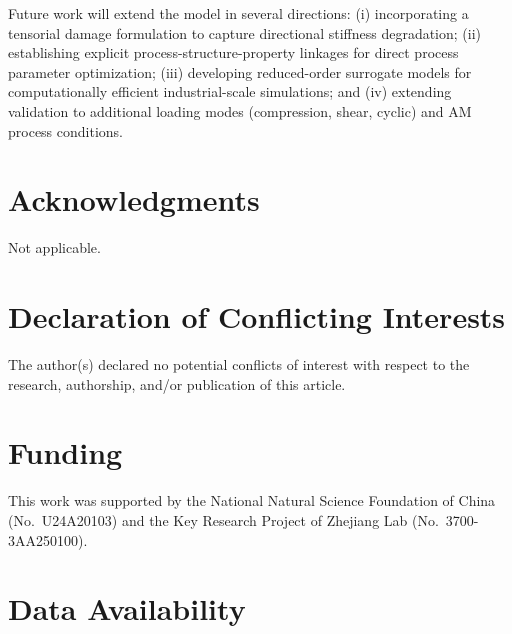 \documentclass[twocolumn]{sagej}
\begin{document}
Future work will extend the model in several directions: (i) incorporating a tensorial damage formulation to capture directional stiffness degradation; (ii) establishing explicit process-structure-property linkages for direct process parameter optimization; (iii) developing reduced-order surrogate models for computationally efficient industrial-scale simulations; and (iv) extending validation to additional loading modes (compression, shear, cyclic) and AM process conditions.

\section*{Acknowledgments}

Not applicable.

\section*{Declaration of Conflicting Interests}

The author(s) declared no potential conflicts of interest with respect to the research, authorship, and/or publication of this article.

\section*{Funding}

This work was supported by the National Natural Science Foundation of China (No.~U24A20103) and the Key Research Project of Zhejiang Lab (No.~3700-3AA250100).

\section*{Data Availability}
\end{document}
